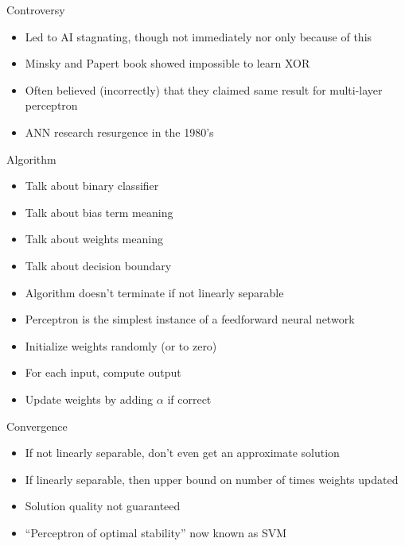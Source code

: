 




Controversy
\begin{itemize}
\item Led to AI stagnating, though not immediately nor only because of this
\item Minsky and Papert book showed impossible to learn XOR
\item Often believed (incorrectly) that they claimed same result for multi-layer perceptron
\item ANN research resurgence in the 1980's
\end{itemize}

Algorithm
\begin{itemize}
\item Talk about binary classifier
\item Talk about bias term meaning
\item Talk about weights meaning
\item Talk about decision boundary
  \vspace{2mm}
\item Algorithm doesn't terminate if not linearly separable
\item Perceptron is the simplest instance of a feedforward neural network
  \vspace{2mm}
\item Initialize weights randomly (or to zero)
\item For each input, compute output
\item Update weights by adding $\alpha$ if correct
\end{itemize}

Convergence
\begin{itemize}
\item If not linearly separable, don't even get an approximate solution
\item If linearly separable, then upper bound on number of times weights updated
\item Solution quality not guaranteed
\item ``Perceptron of optimal stability'' now known as SVM
\end{itemize}


